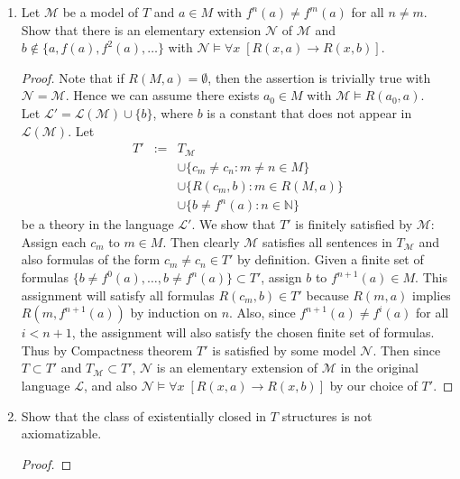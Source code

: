 \documentclass{article}
\begin{document}
\begin{enumerate}[label={\bf Q\arabic*:}]
\begin{enumerate}
      \item Let $\mathcal{M}$ be a model of $T$ and $a\in M$ with
        $f^n(a)\neq f^m(a)$ for all $n\neq m$. Show that there is an
        elementary extension $\mathcal{N}$ of $\mathcal{M}$ and
        $b\not\in\{a,f(a),f^2(a),\ldots\}$ with $\mathcal{N}\models\forall
        x\; [R(x,a)\rightarrow R(x,b)]$.

        \begin{proof}
          Note that if $R(M,a)=\emptyset$, then the assertion is trivially
          true with $\mathcal{N}=\mathcal{M}$. Hence we can assume there
          exists $a_0\in M$ with $\mathcal{M}\models R(a_0,a)$. \\

          Let $\mathcal{L}'=\mathcal{L}(\mathcal{M})\cup\{b\}$, where $b$
          is a constant that does not appear in $\mathcal{L}(\mathcal{M})$.
          Let
          \[\begin{array}{rrl}
            T' &:= &T_\mathcal{M} \\
              &&\cup \{c_m\neq c_n:m\neq n\in M\} \\
              &&\cup\{R(c_m,b):m\in R(M,a)\} \\
              &&\cup\{b\neq f^n(a):n\in\mathbb{N}\}
          \end{array}\]
          be a theory in the language $\mathcal{L}'$. We show that
          $T'$ is finitely satisfied by $\mathcal{M}$: Assign each $c_m$ to
          $m\in M$. Then clearly $\mathcal{M}$ satisfies all sentences in
          $T_\mathcal{M}$ and also formulas of the form $c_m\neq c_n\in
          T'$ by definition. Given a finite set of formulas
          $\{b\neq f^{0}(a),\ldots,b\neq f^{n}(a)\}\subset T'$, assign $b$
          to $f^{n+1}(a)\in M$. This assignment will satisfy all formulas
          $R(c_m,b)\in T'$ because $R(m,a)$ implies $R(m,f^{n+1}(a))$ by
          induction on $n$. Also, since $f^{n+1}(a)\neq f^i(a)$ for all
          $i<n+1$, the assignment will also satisfy the chosen finite set
          of formulas. \\

          Thus by Compactness theorem $T'$ is satisfied by some model
          $\mathcal{N}$. Then since $T\subset T'$ and $T_\mathcal{M}\subset
          T'$, $\mathcal{N}$ is an elementary extension of $\mathcal{M}$ in
          the original language $\mathcal{L}$, and also
          $\mathcal{N}\models\forall x\; [R(x,a)\rightarrow R(x,b)]$ by our
          choice of $T'$.
        \end{proof}

      \item Show that the class of existentially closed in $T$ structures
        is not axiomatizable.
        \begin{proof}
        \end{proof}
    \end{enumerate}
\end{enumerate}
\end{document}
